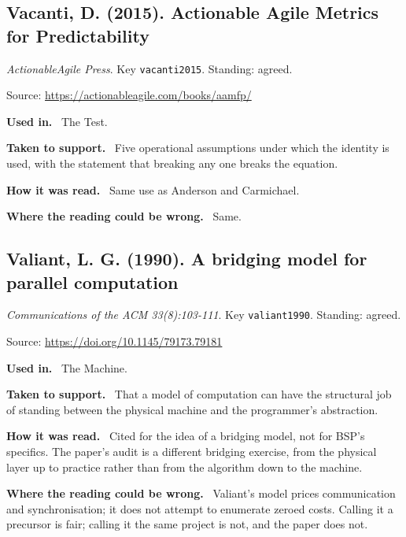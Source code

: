 \documentclass[11pt,oneside]{article}
\newcommand{\field}[1]{\par\noindent\textbf{\color{accent}#1.}\ }
\begin{document}
\hypertarget{src:vacanti2015}{}
\subsection*{Vacanti, D. (2015). Actionable Agile Metrics for Predictability}
\noindent\small\emph{ActionableAgile Press}. Key \texttt{vacanti2015}. Standing: agreed.
\par\noindent\small Source: \url{https://actionableagile.com/books/aamfp/}
\normalsize
\field{Used in} The Test.
\field{Taken to support} Five operational assumptions under which the identity is used, with the statement that breaking any one breaks the equation.
\field{How it was read} Same use as Anderson and Carmichael.
\field{Where the reading could be wrong} Same.

\hypertarget{src:valiant1990}{}
\subsection*{Valiant, L. G. (1990). A bridging model for parallel computation}
\noindent\small\emph{Communications of the ACM 33(8):103-111}. Key \texttt{valiant1990}. Standing: agreed.
\par\noindent\small Source: \url{https://doi.org/10.1145/79173.79181}
\normalsize
\field{Used in} The Machine.
\field{Taken to support} That a model of computation can have the structural job of standing between the physical machine and the programmer's abstraction.
\field{How it was read} Cited for the idea of a bridging model, not for BSP's specifics. The paper's audit is a different bridging exercise, from the physical layer up to practice rather than from the algorithm down to the machine.
\field{Where the reading could be wrong} Valiant's model prices communication and synchronisation; it does not attempt to enumerate zeroed costs. Calling it a precursor is fair; calling it the same project is not, and the paper does not.

\hypertarget{src:vanleeuwen2001}{}
\end{document}
